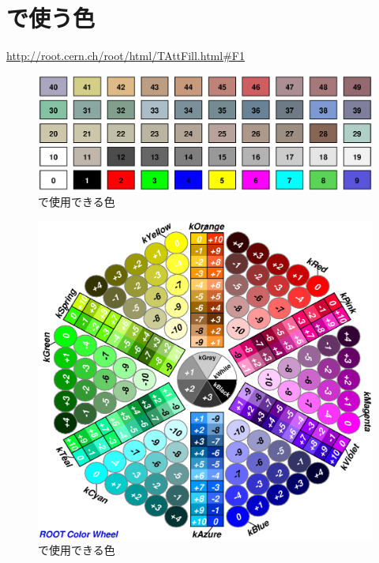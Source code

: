 \documentclass{jarticle}
\begin{document}
 \section{\ROOT で使う色}

 \url{http://root.cern.ch/root/html/TAttFill.html#F1}
 \begin{figure}[htbp]
  \begin{center}
   \includegraphics[width = 140mm]{./picture/filareacolor.eps}
  \end{center}
  \caption{\ROOT で使用できる色}
  \label{Fig:filareacolor}
 \end{figure}

 \begin{figure}[htbp]
  \begin{center}
   \includegraphics[width = 140mm]{./picture/rootcolorwheel.eps}
  \end{center}
  \caption{\ROOT で使用できる色}
  \label{Fig:rootcolorwheel}
 \end{figure}
\end{document}
